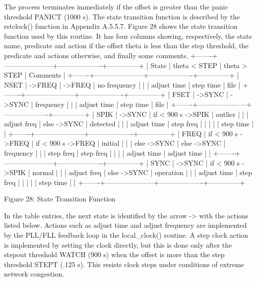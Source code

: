    The process terminates immediately if the offset is greater than the
   panic threshold PANICT (1000 s).  The state transition function is
   described by the rstclock() function in Appendix A.5.5.7.  Figure 28
   shows the state transition function used by this routine.  It has
   four columns showing, respectively, the state name, predicate and
   action if the offset theta is less than the step threshold, the
   predicate and actions otherwise, and finally some comments.
      +-------+---------------------+-------------------+--------------+
      | State | theta < STEP        | theta > STEP      | Comments     |
      +-------+---------------------+-------------------+--------------+
      | NSET  | ->FREQ              | ->FREQ            | no frequency |
      |       | adjust time         | step time         | file         |
      +-------+---------------------+-------------------+--------------+
      | FSET  | ->SYNC              | ->SYNC            | frequency    |
      |       | adjust time         | step time         | file         |
      +-------+---------------------+-------------------+--------------+
      | SPIK  | ->SYNC              | if < 900 s ->SPIK | outlier      |
      |       | adjust freq         | else ->SYNC       | detected     |
      |       | adjust time         | step freq         |              |
      |       |                     | step time         |              |
      +-------+---------------------+-------------------+--------------+
      | FREQ  | if < 900 s ->FREQ   | if < 900 s ->FREQ | initial      |
      |       | else ->SYNC         | else ->SYNC       | frequency    |
      |       | step freq           | step freq         |              |
      |       | adjust time         | adjust time       |              |
      +-------+---------------------+-------------------+--------------+
      | SYNC  | ->SYNC              | if < 900 s ->SPIK | normal       |
      |       | adjust freq         | else ->SYNC       | operation    |
      |       | adjust time         | step freq         |              |
      |       |                     | step time         |              |
      +-------+---------------------+-------------------+--------------+

                   Figure 28: State Transition Function

   In the table entries, the next state is identified by the arrow ->
   with the actions listed below.  Actions such as adjust time and
   adjust frequency are implemented by the PLL/FLL feedback loop in the
   local_clock() routine.  A step clock action is implemented by setting
   the clock directly, but this is done only after the stepout threshold
   WATCH (900 s) when the offset is more than the step threshold STEPT
   (.125 s).  This resists clock steps under conditions of extreme
   network congestion.

